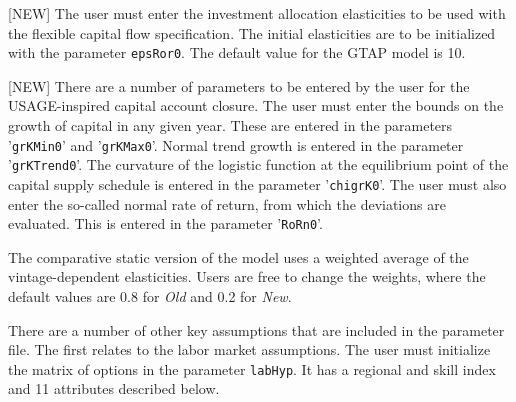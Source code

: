 [NEW] The user must enter the investment allocation elasticities to be used with
the flexible capital flow specification. The initial elasticities are to be
initialized with the parameter \texttt{epsRor0}. The default value for the GTAP
model is 10.

[NEW] There are a number of parameters to be entered by the user for the
USAGE-inspired capital account closure. The user must enter the bounds on the
growth of capital in any given year. These are entered in the parameters
'\texttt{grKMin0}' and '\texttt{grKMax0}'. Normal trend growth is entered in the
parameter '\texttt{grKTrend0}'. The curvature of the logistic function at the
equilibrium point of the capital supply schedule is entered in the parameter
'\texttt{chigrK0}'. The user must also enter the so-called normal rate of
return, from which the deviations are evaluated. This is entered in the
parameter '\texttt{RoRn0}'.

The comparative static version of the model uses a weighted average of the
vintage-dependent elasticities. Users are free to change the weights, where the
default values are 0.8 for \emph{Old} and 0.2 for \emph{New}.

There are a number of other key assumptions that are included in the parameter
file. The first relates to the labor market assumptions. The user must
initialize the matrix of options in the parameter \texttt{labHyp}. It has a
regional and skill index and 11 attributes described below.

